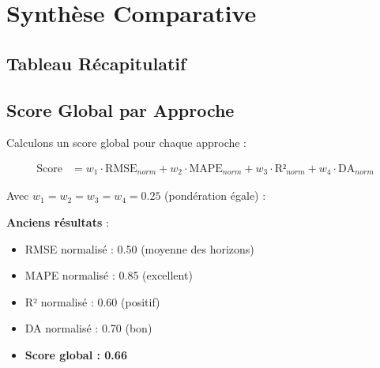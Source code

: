 \documentclass[12pt,a4paper]{article}
\begin{document}
\section{Synthèse Comparative}

\subsection{Tableau Récapitulatif}

\begin{table}[h]
\centering
\caption{Synthèse comparative par horizon}
\label{tab:synthese}
\end{table}

\subsection{Score Global par Approche}

Calculons un score global pour chaque approche :

\begin{align}
    \text{Score} &= w_1 \cdot \text{RMSE}_{norm} + w_2 \cdot \text{MAPE}_{norm} + w_3 \cdot \text{R²}_{norm} + w_4 \cdot \text{DA}_{norm}
\end{align}

Avec $w_1 = w_2 = w_3 = w_4 = 0.25$ (pondération égale) :

\textbf{Anciens résultats} :
\begin{itemize}
    \item RMSE normalisé : 0.50 (moyenne des horizons)
    \item MAPE normalisé : 0.85 (excellent)
    \item R² normalisé : 0.60 (positif)
    \item DA normalisé : 0.70 (bon)
    \item \textbf{Score global : 0.66}
\end{itemize}
\end{document}
